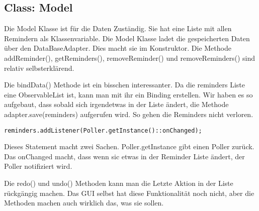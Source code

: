 \subsection{Class: Model}
Die Model Klasse ist für die Daten Zuständig. Sie hat eine Liste mit allen Remindern als Klassenvariable. Die Model Klasse ladet die gespeicherten Daten über den DataBaseAdapter.
Dies macht sie im Konstruktor. Die Methode addReminder(), getReminders(), removeReminder() und removeReminders() sind relativ selbsterklärend.

Die bindData() Methode ist ein bisschen interessanter. Da die reminders Liste eine ObservableList ist, kann man mit ihr ein Binding erstellen. Wir haben es so aufgebaut, dass sobald
sich irgendetwas in der Liste ändert, die Methode adapter.save(reminders) aufgerufen wird. So gehen die Reminders nicht verloren.

\begin{lstlisting}
reminders.addListener(Poller.getInstance()::onChanged);
\end{lstlisting}
Dieses Statement macht zwei Sachen. Poller.getInstance gibt einen Poller zurück. Das onChanged macht, dass wenn sic etwas in der Reminder Liste ändert, der Poller notifiziert wird.

Die redo() und undo() Methoden kann man die Letzte Aktion in der Liste rückgängig machen. Das GUI selbst hat diese Funktionalität noch nicht, aber die Methoden machen auch wirklich das, was sie sollen.
